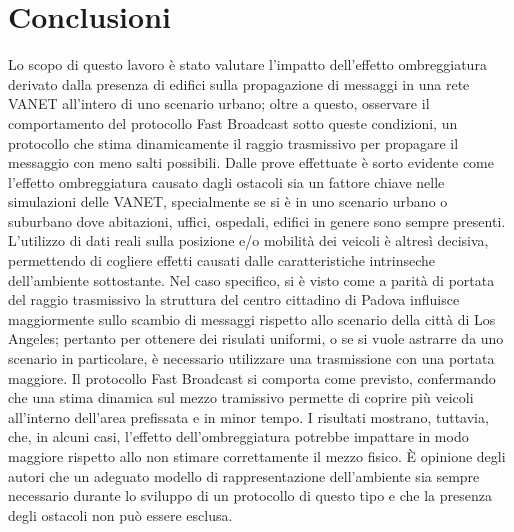 
\chapter{Conclusioni}\label{chap:conclusioni}
Lo scopo di questo lavoro è stato valutare l'impatto dell'effetto ombreggiatura derivato dalla
presenza di edifici sulla propagazione di messaggi in una rete VANET all'intero di uno scenario urbano;
oltre a questo, osservare il comportamento del protocollo Fast Broadcast sotto queste condizioni,
un protocollo che stima dinamicamente il raggio trasmissivo per propagare il messaggio
con meno salti possibili.
Dalle prove effettuate è sorto evidente come l'effetto ombreggiatura causato dagli ostacoli
sia un fattore chiave nelle simulazioni delle VANET, specialmente se si è in uno scenario
urbano o suburbano dove abitazioni, uffici, ospedali, edifici in genere sono sempre presenti.
L'utilizzo di dati reali sulla posizione e/o mobilità dei veicoli è altresì decisiva,
permettendo di cogliere effetti causati dalle caratteristiche intrinseche dell'ambiente sottostante.
Nel caso specifico, si è visto come a parità di portata del raggio trasmissivo la struttura
del centro cittadino di Padova influisce maggiormente sullo scambio di messaggi
rispetto allo scenario della città di Los Angeles;
pertanto per ottenere dei risulati uniformi, o se si vuole astrarre da uno scenario in particolare,
è necessario utilizzare una trasmissione con una portata maggiore.	%
Il protocollo Fast Broadcast si comporta come previsto, confermando che una stima dinamica sul mezzo
tramissivo permette di coprire più veicoli all'interno dell'area prefissata e in minor tempo.
I risultati mostrano, tuttavia, che, in alcuni casi, l'effetto dell'ombreggiatura
potrebbe impattare in modo maggiore rispetto allo non stimare correttamente il mezzo fisico. %
È opinione degli autori che un adeguato modello di rappresentazione dell'ambiente sia
sempre necessario durante lo sviluppo di un protocollo di questo tipo
e che la presenza degli ostacoli non può essere esclusa.

